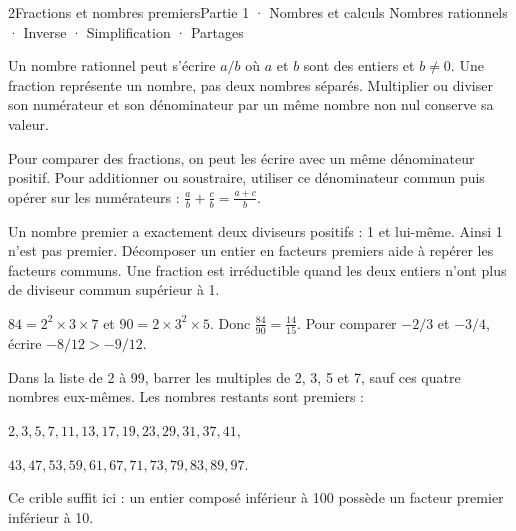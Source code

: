 \begin{ouverture}[calcul]{2}{Fractions et nombres premiers}{Partie 1 · Nombres et calculs}
{Nombres rationnels · Inverse · Simplification · Partages}
\end{ouverture}
\pagestyle{otMain}\essentiel\fontsize{11}{15}\selectfont
{}\label{cours-2-1}
\begin{definition}Un nombre rationnel peut s’écrire $a/b$ où $a$ et $b$ sont des entiers et $b\ne0$. Une fraction représente un nombre, pas deux nombres séparés. Multiplier ou diviser son numérateur et son dénominateur par un même nombre non nul conserve sa valeur.\end{definition}
\begin{propriete}Pour comparer des fractions, on peut les écrire avec un même dénominateur positif. Pour additionner ou soustraire, utiliser ce dénominateur commun puis opérer sur les numérateurs : $\frac ab+\frac cb=\frac{a+c}b$.\end{propriete}
\begin{definition}Un nombre premier a exactement deux diviseurs positifs : 1 et lui-même. Ainsi 1 n’est pas premier. Décomposer un entier en facteurs premiers aide à repérer les facteurs communs. Une fraction est irréductible quand les deux entiers n’ont plus de diviseur commun supérieur à 1.\end{definition}
\begin{exemple}$84=2^2\times3\times7$ et $90=2\times3^2\times5$. Donc $\frac{84}{90}=\frac{14}{15}$. Pour comparer $-2/3$ et $-3/4$, écrire $-8/12>-9/12$.\end{exemple}
\begin{savoirfaire}Dans la liste de 2 à 99, barrer les multiples de 2, 3, 5 et 7, sauf ces quatre nombres eux-mêmes. Les nombres restants sont premiers :\par
{\small $2,3,5,7,11,13,17,19,23,29,31,37,41,$\par
$43,47,53,59,61,67,71,73,79,83,89,97.$}\par
Ce crible suffit ici : un entier composé inférieur à 100 possède un facteur premier inférieur à 10.\end{savoirfaire}
\clearpage
{}\label{cours-2-2}
